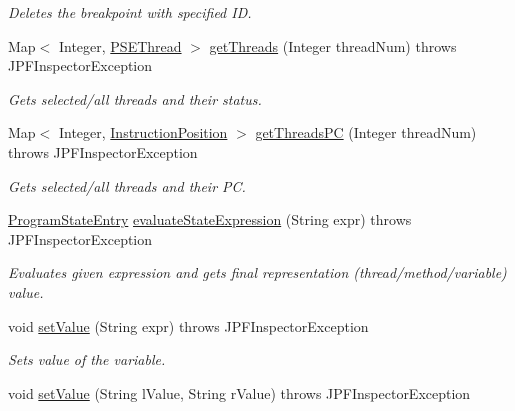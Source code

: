 \begin{DoxyCompactItemize}
\begin{DoxyCompactList}\small\item\em Deletes the breakpoint with specified ID. \end{DoxyCompactList}\item 
Map$<$ Integer, \hyperlink{classgov_1_1nasa_1_1jpf_1_1inspector_1_1common_1_1pse_1_1_p_s_e_thread}{P\+S\+E\+Thread} $>$ \hyperlink{interfacegov_1_1nasa_1_1jpf_1_1inspector_1_1interfaces_1_1_program_state_interface_a54531453dd2373d8f9f166a79547495a}{get\+Threads} (Integer thread\+Num)  throws J\+P\+F\+Inspector\+Exception
\begin{DoxyCompactList}\small\item\em Gets selected/all threads and their status. \end{DoxyCompactList}\item 
Map$<$ Integer, \hyperlink{interfacegov_1_1nasa_1_1jpf_1_1inspector_1_1interfaces_1_1_instruction_position}{Instruction\+Position} $>$ \hyperlink{interfacegov_1_1nasa_1_1jpf_1_1inspector_1_1interfaces_1_1_program_state_interface_a4ca30deeab5ba91a9ee285aabbdb623a}{get\+Threads\+PC} (Integer thread\+Num)  throws J\+P\+F\+Inspector\+Exception
\begin{DoxyCompactList}\small\item\em Gets selected/all threads and their PC. \end{DoxyCompactList}\item 
\hyperlink{classgov_1_1nasa_1_1jpf_1_1inspector_1_1common_1_1pse_1_1_program_state_entry}{Program\+State\+Entry} \hyperlink{interfacegov_1_1nasa_1_1jpf_1_1inspector_1_1interfaces_1_1_program_state_interface_a3a64e61b42c7338fe4f90c9c8519177f}{evaluate\+State\+Expression} (String expr)  throws J\+P\+F\+Inspector\+Exception
\begin{DoxyCompactList}\small\item\em Evaluates given expression and gets final representation (thread/method/variable) value. \end{DoxyCompactList}\item 
void \hyperlink{interfacegov_1_1nasa_1_1jpf_1_1inspector_1_1interfaces_1_1_program_state_interface_aaf980401ba045fdd70af10cb1c956ee0}{set\+Value} (String expr)  throws J\+P\+F\+Inspector\+Exception
\begin{DoxyCompactList}\small\item\em Sets value of the variable. \end{DoxyCompactList}\item 
void \hyperlink{interfacegov_1_1nasa_1_1jpf_1_1inspector_1_1interfaces_1_1_program_state_interface_a992e2deda1c948e41ae9abcc776eec7b}{set\+Value} (String l\+Value, String r\+Value)  throws J\+P\+F\+Inspector\+Exception

\end{DoxyCompactItemize}

